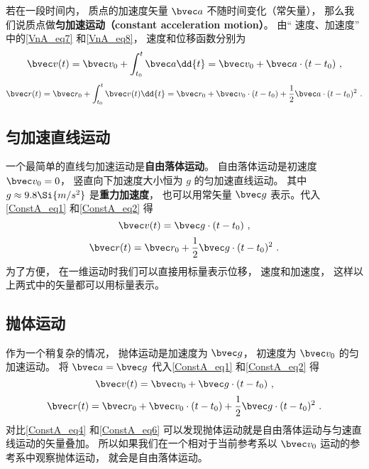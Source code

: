 
\begin{issues}
\issueTODO
\end{issues}

若在一段时间内， 质点的加速度矢量 $\bvec a$ 不随时间变化（常矢量）， 那么我们说质点做\textbf{匀加速运动（constant acceleration motion）}。 由“ 速度、加速度” 中的\autoref{VnA_eq7} 和\autoref{VnA_eq8}， 速度和位移函数分别为
\begin{equation}\label{ConstA_eq1}
\bvec v(t) = \bvec v_0 + \int_{t_0}^{t} \bvec a \dd{t} = \bvec v_0 + \bvec a \cdot (t-t_0)~,
\end{equation}
\begin{equation}\label{ConstA_eq2}
\bvec r(t) = \bvec r_0 + \int_{t_0}^{t} \bvec v(t) \dd{t} = \bvec r_0 + \bvec v_0\cdot (t-t_0) + \frac12 \bvec a\cdot (t-t_0)^2~.
\end{equation}


\subsection{匀加速直线运动}
一个最简单的直线匀加速运动是\textbf{自由落体运动}。 自由落体运动是初速度 $\bvec v_0 = 0$， 竖直向下加速度大小恒为 $g$ 的匀加速直线运动。 其中 $g\approx 9.8\Si{m/s^2}$ 是\textbf{重力加速度}， 也可以用常矢量 $\bvec g$ 表示。代入\autoref{ConstA_eq1} 和\autoref{ConstA_eq2} 得
\begin{equation}\label{ConstA_eq3}
\bvec v(t) = \bvec g \cdot (t-t_0)~,
\end{equation}
\begin{equation}\label{ConstA_eq4}
\bvec r(t) = \bvec r_0 + \frac12 \bvec g \cdot (t-t_0)^2~.
\end{equation}
为了方便， 在一维运动时我们可以直接用标量表示位移， 速度和加速度， 这样以上两式中的矢量都可以用标量表示。

\subsection{抛体运动}
作为一个稍复杂的情况， 抛体运动是加速度为 $\bvec g$， 初速度为 $\bvec v_0$ 的匀加速运动。 将 $\bvec a = \bvec g$ 代入\autoref{ConstA_eq1} 和\autoref{ConstA_eq2} 得
\begin{equation}\label{ConstA_eq5}
\bvec v(t) = \bvec v_0 + \bvec g \cdot (t-t_0)~,
\end{equation}
\begin{equation}\label{ConstA_eq6}
\bvec r(t) = \bvec r_0 + \bvec v_0\cdot (t-t_0) + \frac12 \bvec g\cdot (t-t_0)^2~.
\end{equation}
对比\autoref{ConstA_eq4} 和\autoref{ConstA_eq6} 可以发现抛体运动就是自由落体运动与匀速直线运动的矢量叠加。 所以如果我们在一个相对于当前参考系以 $\bvec v_0$ 运动的参考系中观察抛体运动， 就会是自由落体运动。
